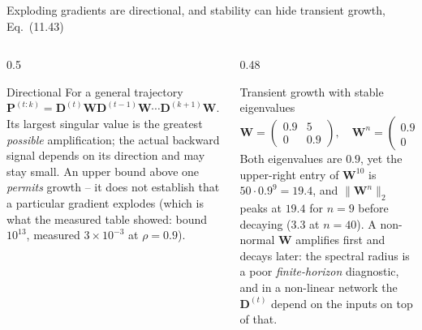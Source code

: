 \documentclass[10pt,aspectratio=169]{beamer}
\begin{document}
\begin{frame}{Exploding gradients are directional, and stability can hide transient growth, Eq.~(11.43)}
\small
\begin{columns}[T]
\begin{column}{0.5\textwidth}
\begin{block}{Directional}
For a general trajectory
$\bm{P}^{(t:k)}=\bm{D}^{(t)}\bm{W}\bm{D}^{(t-1)}\bm{W}\cdots\bm{D}^{(k+1)}\bm{W}$.
Its largest singular value is the greatest \emph{possible} amplification; the
actual backward signal depends on its direction and may stay small.  An upper
bound above one \emph{permits} growth -- it does not establish that a
particular gradient explodes (which is what the measured table showed:
bound $10^{13}$, measured $3\times10^{-3}$ at $\rho=0.9$).
\end{block}
\end{column}
\begin{column}{0.48\textwidth}
\begin{block}{Transient growth with stable eigenvalues}
\[
  \bm{W}=\begin{pmatrix}0.9&5\\0&0.9\end{pmatrix},\quad
  \bm{W}^n=\begin{pmatrix}0.9^n&5n\,0.9^{\,n-1}\\0&0.9^n\end{pmatrix}.
\]
Both eigenvalues are $0.9$, yet the upper-right entry of $\bm{W}^{10}$ is
$50\cdot0.9^9=19.4$, and $\|\bm{W}^n\|_2$ peaks at $19.4$ for $n=9$ before
decaying ($3.3$ at $n=40$).  A non-normal $\bm{W}$ amplifies first and decays
later: the spectral radius is a poor \emph{finite-horizon} diagnostic, and in
a non-linear network the $\bm{D}^{(t)}$ depend on the inputs on top of that.
\end{block}
\end{column}
\end{columns}
\end{frame}
\end{document}
